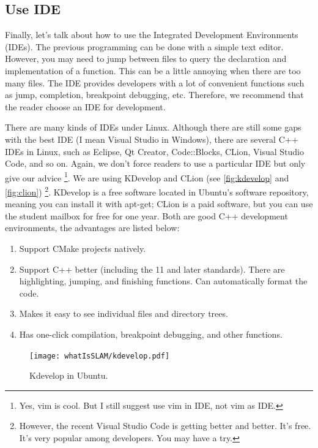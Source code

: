 \subsection{Use IDE}
Finally, let's talk about how to use the Integrated Development Environments (IDEs). The previous programming can be done with a simple text editor. However, you may need to jump between files to query the declaration and implementation of a function. This can be a little annoying when there are too many files. The IDE provides developers with a lot of convenient functions such as jump, completion, breakpoint debugging, etc. Therefore, we recommend that the reader choose an IDE for development.

There are many kinds of IDEs under Linux. Although there are still some gaps with the best IDE (I mean Visual Studio in Windows), there are several C++ IDEs in Linux, such as Eclipse, Qt Creator, Code::Blocks, CLion, Visual Studio Code, and so on. Again, we don't force readers to use a particular IDE but only give our advice \footnote{Yes, vim is cool. But I still suggest use vim in IDE, not vim as IDE.}. We are using KDevelop and CLion (see \autoref{fig:kdevelop} and \autoref{fig:clion}) \footnote{However, the recent Visual Studio Code is getting better and better. It's free. It's very popular among developers. You may have a try. }. KDevelop is a free software located in Ubuntu's software repository, meaning you can install it with apt-get; CLion is a paid software, but you can use the student mailbox for free for one year. Both are good C++ development environments, the advantages are listed below:

\begin{enumerate}
    \item Support CMake projects natively.
    \item Support C++ better (including the 11 and later standards). There are highlighting, jumping, and finishing functions. Can automatically format the code.
    \item Makes it easy to see individual files and directory trees.
    \item Has one-click compilation, breakpoint debugging, and other functions.
\end{enumerate}

\begin{figure}[!ht]
    \centering
    \texttt{[image: whatIsSLAM/kdevelop.pdf]}
    \caption{Kdevelop in Ubuntu.}
    \label{fig:kdevelop}
\end{figure}

